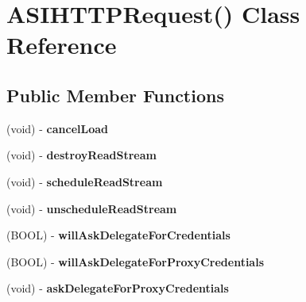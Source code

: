 \hypertarget{interface_a_s_i_h_t_t_p_request_07_08}{
\section{\-A\-S\-I\-H\-T\-T\-P\-Request() \-Class \-Reference}
\label{interface_a_s_i_h_t_t_p_request_07_08}
}
\subsection*{\-Public \-Member \-Functions}
\begin{DoxyCompactItemize}
\item 
\hypertarget{interface_a_s_i_h_t_t_p_request_07_08_ad64a88ff354a1e9acd0e50f6bd6383af}{
(void) -\/ {\bfseries cancel\-Load}}
\label{interface_a_s_i_h_t_t_p_request_07_08_ad64a88ff354a1e9acd0e50f6bd6383af}

\item 
\hypertarget{interface_a_s_i_h_t_t_p_request_07_08_ab3dbbd41ced7e54f058267aaa2e80150}{
(void) -\/ {\bfseries destroy\-Read\-Stream}}
\label{interface_a_s_i_h_t_t_p_request_07_08_ab3dbbd41ced7e54f058267aaa2e80150}

\item 
\hypertarget{interface_a_s_i_h_t_t_p_request_07_08_a9298c802e2cd503d0f3ae6f508f59e52}{
(void) -\/ {\bfseries schedule\-Read\-Stream}}
\label{interface_a_s_i_h_t_t_p_request_07_08_a9298c802e2cd503d0f3ae6f508f59e52}

\item 
\hypertarget{interface_a_s_i_h_t_t_p_request_07_08_a036ae593e23c948377acca2d405ab265}{
(void) -\/ {\bfseries unschedule\-Read\-Stream}}
\label{interface_a_s_i_h_t_t_p_request_07_08_a036ae593e23c948377acca2d405ab265}

\item 
\hypertarget{interface_a_s_i_h_t_t_p_request_07_08_a2fb19d10e5d6449c7845042add6dc2a1}{
(\-B\-O\-O\-L) -\/ {\bfseries will\-Ask\-Delegate\-For\-Credentials}}
\label{interface_a_s_i_h_t_t_p_request_07_08_a2fb19d10e5d6449c7845042add6dc2a1}

\item 
\hypertarget{interface_a_s_i_h_t_t_p_request_07_08_a52ecd8ea9d13c585c86a7f9031f1d2e8}{
(\-B\-O\-O\-L) -\/ {\bfseries will\-Ask\-Delegate\-For\-Proxy\-Credentials}}
\label{interface_a_s_i_h_t_t_p_request_07_08_a52ecd8ea9d13c585c86a7f9031f1d2e8}

\item 
\hypertarget{interface_a_s_i_h_t_t_p_request_07_08_a545869781fbd1e24ed126da754536006}{
(void) -\/ {\bfseries ask\-Delegate\-For\-Proxy\-Credentials}}
\label{interface_a_s_i_h_t_t_p_request_07_08_a545869781fbd1e24ed126da754536006}


\end{DoxyCompactItemize}
